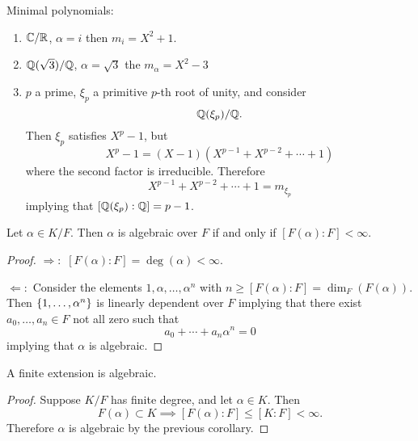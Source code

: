 \begin{eg}
	Minimal polynomials:
	\begin{enumerate}
		\item $\mathbb{C} / \mathbb{R}$, $\alpha = i$ then $m_i = X^2 + 1$.
		\item $\mathbb{Q}(\sqrt 3) / \mathbb{Q}$, $\alpha = \sqrt 3$ the $m_\alpha = X^2 - 3$
		\item $p$ a prime, $\xi_p$ a primitive $p$-th root of unity, and consider
		\[
			\mathbb{Q}(\xi_p) / \mathbb{Q}.
		\]
		Then $\xi_p$ satisfies $X^p - 1$, but
		\[
			X^p - 1 = (X-1)(X^{p-1} + X^{p-2} + \cdots + 1)
		\]
		where the second factor is irreducible. Therefore
		\[
			X^{p-1} + X^{p-2} + \cdots + 1 = m_{\xi_p}
		\]
		implying that $[\mathbb{Q}(\xi_p):\mathbb{Q}] = p-1$.
	\end{enumerate}
\end{eg}

\begin{cor}
	Let $\alpha \in K / F$. Then $\alpha$ is algebraic over $F$ if and only if $[F(\alpha) : F] < \infty$. 
\end{cor}
\begin{proof}
	$\Rightarrow:$ $[F(\alpha): F] = \deg(\alpha) < \infty$.
	
	$\Leftarrow:$ Consider the elements $1, \alpha, \ldots, \alpha^n$ with $n \geq [F(\alpha) : F] = \dim_F(F(\alpha))$. Then $\left\{1, \ldots, \alpha^n\right\}$ is linearly dependent over $F$ implying that there exist $a_0, \ldots, a_n \in F$ not all zero such that
	\[
		a_0 + \cdots + a_n \alpha^n = 0
	\]
	implying that $\alpha$ is algebraic.
\end{proof}

\begin{cor}
	A finite extension is algebraic.
\end{cor}
\begin{proof}
	Suppose $K/F$ has finite degree, and let $\alpha \in K$. Then
	\[
		F(\alpha) \subset K \implies [F(\alpha):F] \leq [K:F] < \infty.
	\]
	Therefore $\alpha$ is algebraic by the previous corollary.
\end{proof}

